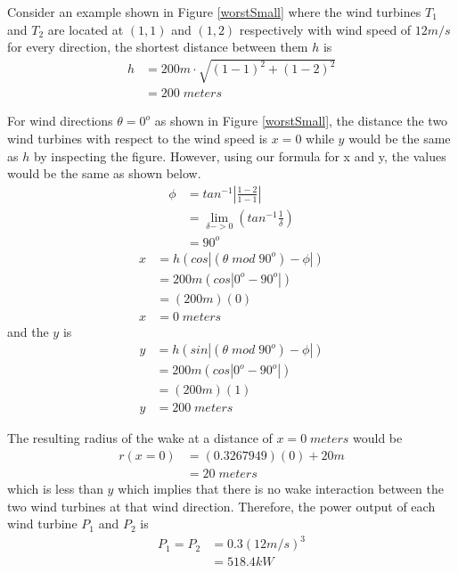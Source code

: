     Consider an example shown in Figure \ref{worstSmall} where the wind turbines $T_1$ and $T_2$ are located at $(1,1)$ and $(1,2)$ respectively with wind speed of $12m/s$ for every direction, the shortest distance between them $h$ is
    \begin{align*}
        h
        &=200m\cdot \sqrt{(1-1)^2 + (1-2)^2} \\
        &=200\;meters
    \end{align*}
    
    For wind directions $\theta=0^o$ as shown in Figure \ref{worstSmall}, the distance the two wind turbines with respect to the wind speed is $x=0$ while $y$ would be the same as $h$ by inspecting the figure. However, using our formula for x and y, the values would be the same as shown below.
    \begin{align*}
        \phi
    	&= tan^{-1} \left| \frac{1-2}{1-1} \right| \\
    	&= \lim_{\delta -> 0} \left( tan^{-1} \frac{1}{\delta} \right) \\
    	&= 90^o
    \end{align*}
        \begin{align*}
        x &= h(cos|(\theta\;mod\;90^{o})-\phi|) \\
          &= 200m(cos|0^{o}-90^{o}|) \\
          &= (200m)(0) \\
        x &= 0\;meters
    \end{align*}
and the $y$ is
    \begin{align*}
        y &= h(sin|(\theta\;mod\;90^{o})-\phi|) \\
          &= 200m(cos|0^{o}-90^{o}|) \\
          &= (200m)(1) \\
        y &= 200\;meters
    \end{align*}
    
    The resulting radius of the wake at a distance of $x=0\;meters$ would be
    \begin{align*}
        r(x=0)&=(0.3267949)(0) + 20m \\
        &= 20 \;meters
    \end{align*}
    which is less than $y$ which implies that there is no wake interaction between the two wind turbines at that wind direction. Therefore, the power output of each wind turbine $P_1$ and $P_2$ is
    \begin{align*}
        P_1=P_2
        &=0.3(12m/s)^3 \\
        &= 518.4kW
    \end{align*}
    
